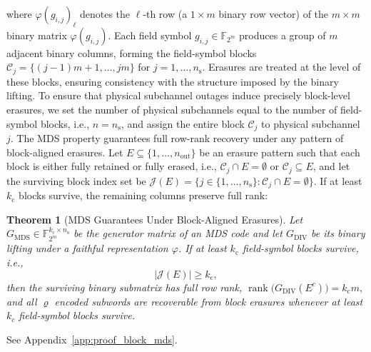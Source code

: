 \documentclass[lettersize,journal]{IEEEtran}
\newtheorem{theorem}{Theorem}
\begin{document}
where $\varphi(g_{i,j})_\ell$ denotes the $\ell$-th row 
(a $1 \times m$ binary row vector) of the $m \times m$ binary 
matrix $\varphi(g_{i,j})$. Each field symbol $g_{i,j} \in \mathbb{F}_{2^m}$ produces a group 
of $m$ adjacent binary columns, forming the field-symbol blocks 
$\mathcal{C}_j = \{(j-1)m+1,\ldots,jm\}$ for $j = 1,\ldots,n_{\mathrm{s}}$. 
Erasures are treated at the level of these blocks, ensuring 
consistency with the structure imposed by the binary lifting. To 
ensure that physical subchannel outages induce precisely block-level 
erasures, we set the number of physical subchannels equal to the 
number of field-symbol blocks, i.e., $n = n_{\mathrm{s}}$, and 
assign the entire block $\mathcal{C}_j$ to physical subchannel $j$. 
The MDS property guarantees full row-rank recovery under any pattern 
of block-aligned erasures. Let $E \subseteq \{1,\ldots,n_{\text{out}}\}$ 
be an erasure pattern such that each block is either fully retained 
or fully erased, i.e., $\mathcal{C}_j \cap E = \emptyset$ or 
$\mathcal{C}_j \subseteq E$, and let the surviving block index set be 
$\mathcal{J}(E) = \{ j \in \{1,\ldots,n_{\mathrm{s}}\} : 
\mathcal{C}_j \cap E = \emptyset \}$. 
If at least $k_{\mathrm{c}}$ blocks survive, the remaining columns 
preserve full rank:

\begin{theorem}[MDS Guarantees Under Block-Aligned Erasures]
\label{thm:block_mds}
Let $G_{\mathrm{MDS}} \in 
\mathbb{F}_{2^m}^{k_{\mathrm{c}} \times n_{\mathrm{s}}}$ be the 
generator matrix of an MDS code and let $G_{\mathrm{DIV}}$ be its 
binary lifting under a faithful representation $\varphi$. If at 
least $k_{\mathrm{c}}$ field-symbol blocks survive, i.e.,
\[
|\mathcal{J}(E)| \geq k_{\mathrm{c}},
\]
then the surviving binary submatrix has full row rank,
$\operatorname{rank}\bigl(G_{\mathrm{DIV}}(E^c)\bigr)=k_{\mathrm{c}} m,
$ and all $\varrho$ encoded subwords are recoverable from block erasures whenever at least $k_c$ field-symbol blocks survive.
\end{theorem}

\begin{IEEEproof}
See Appendix~\ref{app:proof_block_mds}.
\end{IEEEproof}
\end{document}
